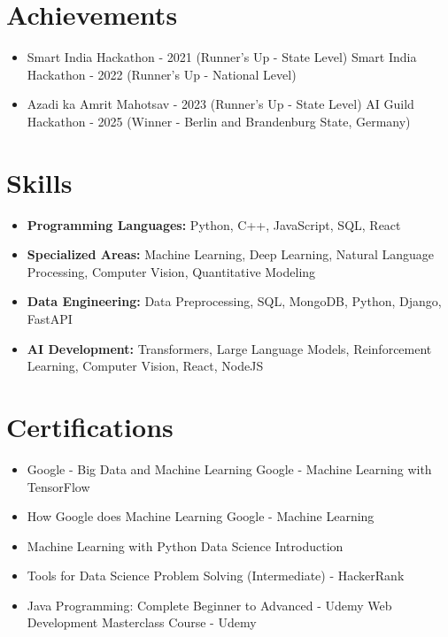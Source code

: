 \documentclass[a4paper,10pt]{article}
\begin{document}
\section*{Achievements}
\begin{itemize}
\item Smart India Hackathon - 2021 (Runner's Up - State Level) \hfill Smart India Hackathon - 2022 (Runner's Up - National Level)
\item Azadi ka Amrit Mahotsav - 2023 (Runner's Up - State Level) \hfill AI Guild Hackathon - 2025 (Winner - Berlin and Brandenburg State, Germany)
\end{itemize}

\section*{Skills}
\begin{itemize}
  \item \textbf{Programming Languages:} Python, C++, JavaScript, SQL, React
  \item \textbf{Specialized Areas:} Machine Learning, Deep Learning, Natural Language Processing, Computer Vision, Quantitative Modeling
  \item \textbf{Data Engineering:} Data Preprocessing, SQL, MongoDB, Python, Django, FastAPI
  \item \textbf{AI Development:} Transformers, Large Language Models, Reinforcement Learning, Computer Vision, React, NodeJS
\end{itemize}

\section*{Certifications}
\begin{itemize}
\item Google - Big Data and Machine Learning \hfill Google - Machine Learning with TensorFlow
\item How Google does Machine Learning \hfill Google - Machine Learning
\item Machine Learning with Python \hfill Data Science Introduction
\item Tools for Data Science \hfill Problem Solving (Intermediate) - HackerRank
\item Java Programming: Complete Beginner to Advanced - Udemy \hfill Web Development Masterclass Course - Udemy
\end{itemize}
\end{document}
